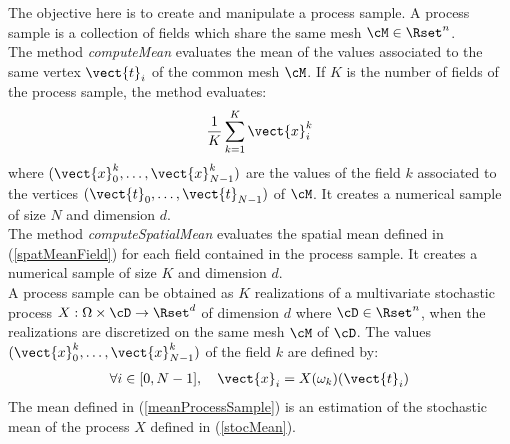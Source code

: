\renewcommand{\filename}{docUC_ProcessSample.tex}
\renewcommand{\filetitle}{UC : Manipulation of a process sample}

\HeaderIILevel

\label{UCprocessSample}



The objective here is to create and manipulate a process sample. A process sample is a collection of fields which share the same mesh $\cM \in \Rset^n$.\\

The method \emph{computeMean} evaluates the mean of the values associated to the same vertex $\vect{t}_i$ of the common mesh $\cM$. If $K$ is the number of fields of the process sample, the method evaluates:
\begin{align}\label{meanProcessSample}
  \displaystyle \frac{1}{K} \sum_{k=1}^K \vect{x}_i^k
\end{align}
where $(\vect{x}_0^k, \dots, \vect{x}_{N-1}^k)$ are the values of the field $k$ associated to the vertices $(\vect{t}_0, \dots, \vect{t}_{N-1})$ of $\cM$. It creates a numerical sample of size $N$ and dimension $d$.\\

The method \emph{computeSpatialMean} evaluates the spatial mean defined in (\ref{spatMeanField}) for each field contained in the process sample. It creates a numerical sample of size $K$ and dimension $d$.\\


A process sample can be obtained as $K$ realizations of a multivariate stochastic process  $X: \Omega \times \cD \rightarrow \Rset^d$   of dimension $d$ where $\cD \in \Rset^n$, when the realizations are discretized on the same mesh $\cM$ of $\cD$. The  values $(\vect{x}_0^k, \dots, \vect{x}_{N-1}^k)$ of the field $k$ are defined by:
\begin{align}
  \forall i \in [0, N-1],\quad   \vect{x}_i= X(\omega_k)(\vect{t}_i)
\end{align}
The mean defined in (\ref{meanProcessSample}) is an estimation of the stochastic mean of the process $X$ defined in (\ref{stocMean}). \\


